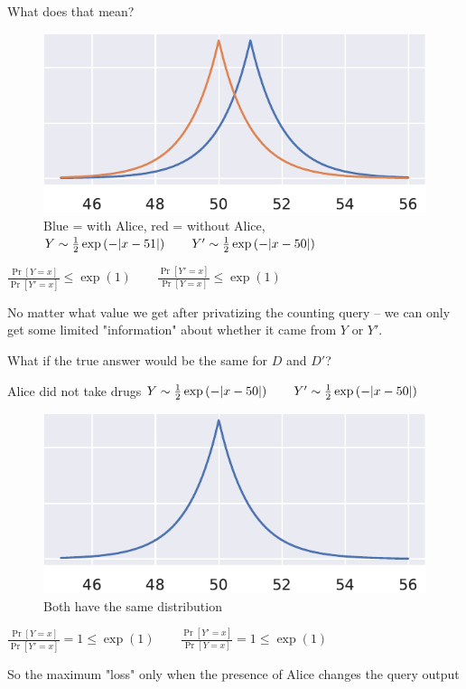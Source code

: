 \documentclass[12pt,aspectratio=169,handout]{beamer}
\begin{document}
\begin{frame}{What does that mean?}
\begin{figure}
\centering
\includegraphics[width=0.4\linewidth]{img/laplace-02.pdf}
\caption{Blue = with Alice, red = without Alice, $Y \sim  \frac{1}{2} \exp \left(- \abs{x - 51} \right) \qquad
Y' \sim \frac{1}{2} \exp \left(- \abs{x - 50} \right)$}
\end{figure}

$
\frac{\Pr[Y = x]}{\Pr[Y' = x]} \leq \exp(1) \qquad
\frac{\Pr[Y' = x]}{\Pr[Y = x]} \leq \exp(1)
$


No matter what value we get after privatizing the counting query -- we can only get some limited "information" about whether it came from $Y$ or $Y'$.



\end{frame}





\begin{frame}{What if the true answer would be the same for $D$ and $D'$?}

Alice did not take drugs
$
Y \sim  \frac{1}{2} \exp \left(- \abs{x - 50} \right) \qquad
Y' \sim \frac{1}{2} \exp \left(- \abs{x - 50} \right) 
$

\begin{figure}
\centering
\includegraphics[width=0.4\linewidth]{img/laplace-density2.pdf}
\caption{Both have the same distribution}
\end{figure}

$
\frac{\Pr[Y = x]}{\Pr[Y' = x]} = 1 \leq \exp(1) \qquad
\frac{\Pr[Y' = x]}{\Pr[Y = x]} = 1 \leq \exp(1)
$

So the maximum "loss" only when the presence of Alice changes the query output

\end{frame}
\end{document}
